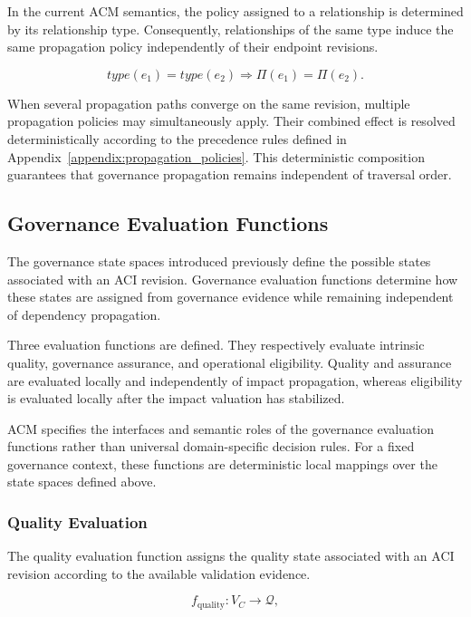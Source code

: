 \documentclass[10pt]{article}
\begin{document}
In the current ACM semantics, the policy assigned to a relationship is determined by its relationship type. Consequently, relationships of the same type induce the same propagation policy independently of their endpoint revisions.

\begin{equation}
	type(e_1)=type(e_2)
	\Longrightarrow
	\Pi(e_1)=\Pi(e_2).
	\label{eq:policy_type_consistency}
\end{equation}

When several propagation paths converge on the same revision, multiple propagation policies may simultaneously apply. Their combined effect is resolved deterministically according to the precedence rules defined in Appendix~\ref{appendix:propagation_policies}. This deterministic composition guarantees that governance propagation remains independent of traversal order.

\subsection{Governance Evaluation Functions}
\label{sec:evaluation_functions}

The governance state spaces introduced previously define the possible states associated with an ACI revision. Governance evaluation functions determine how these states are assigned from governance evidence while remaining independent of dependency propagation.

Three evaluation functions are defined. They respectively evaluate intrinsic quality, governance assurance, and operational eligibility. Quality and assurance are evaluated locally and independently of impact propagation, whereas eligibility is evaluated locally after the impact valuation has
stabilized.

ACM specifies the interfaces and semantic roles of the governance evaluation functions rather than universal domain-specific decision rules. For a fixed governance context, these functions are deterministic local mappings over the state spaces defined above.

\subsubsection{Quality Evaluation}

The quality evaluation function assigns the quality state associated with an ACI revision according to the available validation evidence.

\begin{equation}
	f_{\mathrm{quality}} : V_C \rightarrow \mathcal{Q},
	\label{eq:f_quality}
\end{equation}
\end{document}
